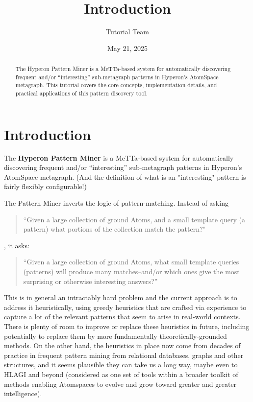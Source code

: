 \documentclass{article}
\title{Introduction }
\author{Tutorial Team}
\date{May 21, 2025}
\begin{document}
\maketitle

\begin{abstract}
The Hyperon Pattern Miner is a MeTTa-based system for automatically discovering frequent and/or ``interesting'' sub-metagraph patterns in Hyperon's AtomSpace metagraph. This tutorial covers the core concepts, implementation details, and practical applications of this pattern discovery tool.
\end{abstract}

\tableofcontents

\section{Introduction}

The \textbf{Hyperon Pattern Miner} is a MeTTa-based system for automatically discovering  frequent and/or ``interesting''  sub-metagraph patterns in Hyperon's AtomSpace metagraph.   (And the definition of what is an "interesting" pattern is fairly flexibly configurable!)

The Pattern Miner inverts the logic of pattern-matching.   Instead of asking

\begin{quote}
``Given a large collection of ground Atoms, and a small template query (a pattern) what portions of the collection match the pattern?"
\end{quote}

\noindent, it asks:

\begin{quote}
``Given a large collection of ground Atoms, what small template queries (patterns) will produce many matches--and/or which ones give the most surprising or otherwise interesting answers?''
\end{quote}

This is in general an intractably hard problem and the current approach is to address it heuristically, using greedy heuristics that are crafted via experience to capture a lot of the relevant patterns that seem to arise in real-world contexts.   There is plenty of room to improve or replace these heuristics in future, including potentially to replace them by more fundamentally theoretically-grounded methods.   On the other hand, the heuristics in place now come from decades of practice in frequent pattern mining from relational databases, graphs and other structures, and it seems plausible they can take us a long way, maybe even to HLAGI and beyond (considered as one set of tools within a broader toolkit of methods enabling Atomspaces to evolve and grow toward greater and greater intelligence).
\end{document}
